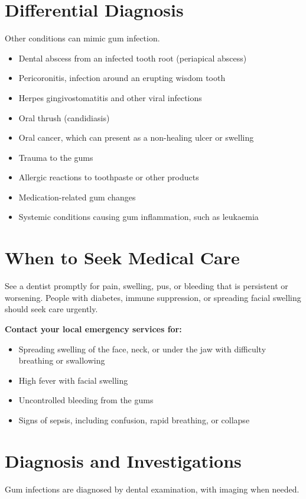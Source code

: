 \section*{Differential Diagnosis}
Other conditions can mimic gum infection.

\begin{itemize}
    \item Dental abscess from an infected tooth root (periapical abscess)
    \item Pericoronitis, infection around an erupting wisdom tooth
    \item Herpes gingivostomatitis and other viral infections
    \item Oral thrush (candidiasis)
    \item Oral cancer, which can present as a non-healing ulcer or swelling
    \item Trauma to the gums
    \item Allergic reactions to toothpaste or other products
    \item Medication-related gum changes
    \item Systemic conditions causing gum inflammation, such as leukaemia
\end{itemize}

\section*{When to Seek Medical Care}
See a dentist promptly for pain, swelling, pus, or bleeding that is persistent or worsening. People with diabetes, immune suppression, or spreading facial swelling should seek care urgently.

\textbf{Contact your local emergency services for:}
\begin{itemize}
    \item Spreading swelling of the face, neck, or under the jaw with difficulty breathing or swallowing
    \item High fever with facial swelling
    \item Uncontrolled bleeding from the gums
    \item Signs of sepsis, including confusion, rapid breathing, or collapse
\end{itemize}

\section*{Diagnosis and Investigations}
Gum infections are diagnosed by dental examination, with imaging when needed.

